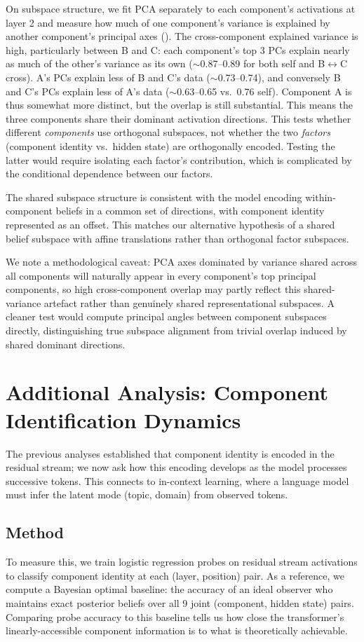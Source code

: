 \documentclass{article}
\begin{document}
On subspace structure, we fit PCA separately to each component's activations at layer 2 and measure how much of one component's variance is explained by another component's principal axes (). The cross-component explained variance is high, particularly between B and C: each component's top 3 PCs explain nearly as much of the other's variance as its own ($\sim$0.87--0.89 for both self and B$\leftrightarrow$C cross). A's PCs explain less of B and C's data ($\sim$0.73--0.74), and conversely B and C's PCs explain less of A's data ($\sim$0.63--0.65 vs.\ 0.76 self). Component A is thus somewhat more distinct, but the overlap is still substantial. This means the three components share their dominant activation directions. This tests whether different \textit{components} use orthogonal subspaces, not whether the two \textit{factors} (component identity vs.\ hidden state) are orthogonally encoded. Testing the latter would require isolating each factor's contribution, which is complicated by the conditional dependence between our factors.

The shared subspace structure is consistent with the model encoding within-component beliefs in a common set of directions, with component identity represented as an offset. This matches our alternative hypothesis of a shared belief subspace with affine translations rather than orthogonal factor subspaces.

We note a methodological caveat: PCA axes dominated by variance shared across all components will naturally appear in every component's top principal components, so high cross-component overlap may partly reflect this shared-variance artefact rather than genuinely shared representational subspaces. A cleaner test would compute principal angles between component subspaces directly, distinguishing true subspace alignment from trivial overlap induced by shared dominant directions.


\section{Additional Analysis: Component Identification Dynamics}

The previous analyses established that component identity is encoded in the residual stream; we now ask how this encoding develops as the model processes successive tokens. This connects to in-context learning, where a language model must infer the latent mode (topic, domain) from observed tokens.

\subsection{Method} To measure this, we train logistic regression probes on residual stream activations to classify component identity at each (layer, position) pair. As a reference, we compute a Bayesian optimal baseline: the accuracy of an ideal observer who maintains exact posterior beliefs over all 9 joint (component, hidden state) pairs. Comparing probe accuracy to this baseline tells us how close the transformer's linearly-accessible component information is to what is theoretically achievable.
\end{document}
